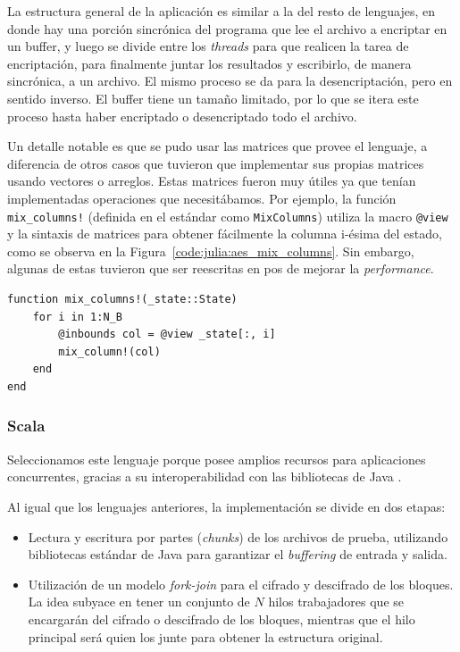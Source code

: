 \documentclass[11pt]{article}
\let\Oldsubsubsection\subsubsection
\renewcommand{\subsubsection}{\FloatBarrier\Oldsubsubsection}
\newcommand{\english}[1]{\textit{#1}}
\begin{document}
La estructura general de la aplicación es similar a la del resto de lenguajes, en donde hay una porción sincrónica del programa que lee el archivo a encriptar en un buffer, y luego se divide entre los \english{threads} para que realicen la tarea de encriptación, para finalmente juntar los resultados y escribirlo, de manera sincrónica, a un archivo. El mismo proceso se da para la desencriptación, pero en sentido inverso. El buffer tiene un tamaño limitado, por lo que se itera este proceso hasta haber encriptado o desencriptado todo el archivo.

Un detalle notable es que se pudo usar las matrices que provee el lenguaje, a diferencia de otros casos que tuvieron que implementar sus propias matrices usando vectores o arreglos. Estas matrices fueron muy útiles ya que tenían implementadas operaciones que necesitábamos. Por ejemplo, la función \lstinline{mix_columns!} (definida en el estándar como \lstinline{MixColumns}) utiliza la macro \lstinline{@view} y la sintaxis de matrices para obtener fácilmente la columna i-ésima del estado, como se observa en la Figura~\ref{code:julia:aes_mix_columns}. Sin embargo, algunas de estas tuvieron que ser reescritas en pos de mejorar la \english{performance}.

\begin{listing}[h]
\begin{verbatim}
function mix_columns!(_state::State)
    for i in 1:N_B
        @inbounds col = @view _state[:, i]
        mix_column!(col)
    end
end
\end{verbatim}
\caption{Implementación de la función \lstinline{mix_columns!} en Julia}
\label{code:julia:aes_mix_columns}
\end{listing}

\subsubsection{Scala}

Seleccionamos este lenguaje porque posee amplios recursos para aplicaciones concurrentes, gracias a su interoperabilidad con las bibliotecas de Java \cite{scala:ex:why_scala_3}.

Al igual que los lenguajes anteriores, la implementación se divide en dos etapas:

\begin{itemize}
    \item Lectura y escritura por partes (\english{chunks}) de los archivos de prueba, utilizando bibliotecas estándar de Java para garantizar el \english{buffering} de entrada y salida.
    \item Utilización de un modelo \english{fork-join} para el cifrado y descifrado de los bloques. La idea subyace en tener un conjunto de $N$ hilos trabajadores que se encargarán del cifrado o descifrado de los bloques, mientras que el hilo principal será quien los junte para obtener la estructura original.
\end{itemize}
\end{document}

